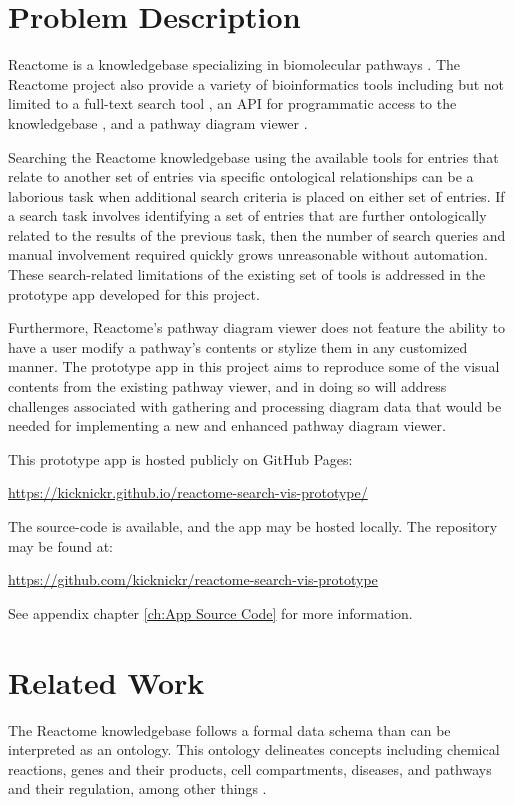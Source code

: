 \documentclass[12pt, letterpaper]{report}
\begin{document}
\chapter{Problem Description}
\label{ch:Problem Description}

Reactome is a knowledgebase specializing in biomolecular pathways \cite{FabregatAntonio2018RgdE}. The Reactome project also provide a variety of bioinformatics tools including but not limited to a full-text search tool \cite{FabregatA.2016Trpk}, an API for programmatic access to the knowledgebase \cite{ContentServiceGeneralDescription}, and a pathway diagram viewer \cite{PathwayDiagramsSpecifications}.

Searching the Reactome knowledgebase using the available tools for entries that relate to another set of entries via specific ontological relationships can be a laborious task when additional search criteria is placed on either set of entries. If a search task involves identifying a set of entries that are further ontologically related to the results of the previous task, then the number of search queries and manual involvement required quickly grows unreasonable without automation. These search-related limitations of the existing set of tools is addressed in the prototype app developed for this project.

Furthermore, Reactome's pathway diagram viewer does not feature the ability to have a user modify a pathway's contents or stylize them in any customized manner. The prototype app in this project aims to reproduce some of the visual contents from the existing pathway viewer, and in doing so will address challenges associated with gathering and processing diagram data that would be needed for implementing a new and enhanced pathway diagram viewer.

This prototype app is hosted publicly on GitHub Pages:

\noindent\url{https://kicknickr.github.io/reactome-search-vis-prototype/}

The source-code is available, and the app may be hosted locally. The repository may be found at:

\noindent\url{https://github.com/kicknickr/reactome-search-vis-prototype}

See appendix chapter \ref{ch:App Source Code} for more information.

\chapter{Related Work}
The Reactome knowledgebase follows a formal data schema \cite{VastrikImre2007Rakb} than can be interpreted as an ontology. This ontology delineates concepts including chemical reactions, genes and their products, cell compartments, diseases, and pathways and their regulation, among other things \cite{DataModelGeneralDescription, GraphDatabaseDataSchema}.
\end{document}
